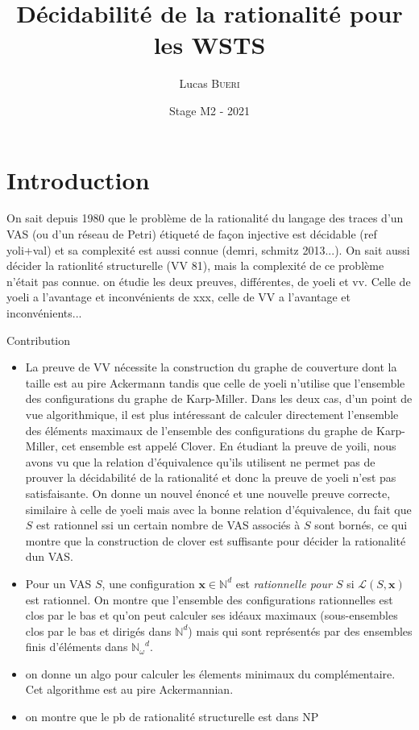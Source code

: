\documentclass[a4paper,final]{article}
\title{Décidabilité de la rationalité pour les WSTS}
\author{Lucas \textsc{Bueri}}
\date{Stage M2 - 2021}
\theoremstyle{definition}
\newcommand{\N}{\ensuremath{\mathbb{N}}}
\newcommand{\Nomega}{\ensuremath{\mathbb{N}_\omega}}
\newcommand{\lang}{\ensuremath{\mathcal{L}}}
\newcommand{\vect}[1]{\ensuremath{\mathbf{#1}}}
\begin{document}
\maketitle


\section{Introduction}

On sait depuis 1980 que le problème de la rationalité du langage des traces d'un VAS (ou d'un réseau de Petri) étiqueté de façon injective est décidable (ref yoli+val) et sa complexité est aussi connue (demri, schmitz 2013...). On sait aussi décider la rationlité structurelle (VV 81), mais la complexité de ce problème n'était pas connue. on étudie les deux preuves, différentes, de yoeli et vv. Celle de yoeli a l'avantage et inconvénients de xxx, celle de VV a l'avantage et inconvénients...


Contribution
\begin{itemize}
    \item La preuve de VV nécessite la construction du graphe de couverture dont la taille est au pire Ackermann tandis que celle de yoeli n'utilise que l'ensemble des configurations du graphe de Karp-Miller. Dans les deux cas, d'un point de vue algorithmique, il est plus intéressant de calculer directement l'ensemble des éléments maximaux de l'ensemble des configurations du graphe de Karp-Miller, cet ensemble est appelé Clover. En étudiant la preuve de yoili, nous avons vu que la relation d'équivalence qu'ils utilisent ne permet pas de prouver la décidabilité de la rationalité et donc la preuve de yoeli n'est pas satisfaisante. On donne un nouvel énoncé et une nouvelle preuve correcte, similaire à celle de yoeli mais avec la bonne relation d'équivalence, du fait que $S$ est rationnel ssi un certain nombre de VAS associés à $S$ sont bornés, ce qui montre que la construction de clover est suffisante pour décider la rationalité dun VAS.
    \item Pour un VAS $S$, une configuration $\vect{x} \in \N^d$ est \emph{rationnelle pour $S$} si $\lang(S,\vect{x})$ est rationnel. On montre que l'ensemble des configurations rationnelles est clos par le bas et qu'on peut calculer ses idéaux maximaux (sous-ensembles clos par le bas et dirigés dans $\N^d$) mais qui sont représentés par des ensembles finis d'éléments dans $\Nomega^d$.
    \item on donne un algo pour calculer les élements minimaux du complémentaire. Cet algorithme est au pire Ackermannian.
    \item on montre que le pb de rationalité structurelle est dans NP

\end{itemize}
\end{document}
